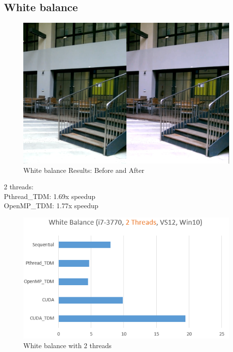 \documentclass{acm_proc_article-sp}
\begin{document}
\subsection{White balance}
\begin{figure}[H]
  \includegraphics[width=\linewidth,natwidth=1230,natheight=844]{whitebalance_comparison.png}
  \caption{White balance Results: Before and After}
  \label{fig:whitebalance_comparison}
\end{figure}
2 threads: \\
Pthread\_TDM: 1.69x speedup \\
OpenMP\_TDM: 1.77x speedup
\begin{figure}[H]
  \includegraphics[width=\linewidth,natwidth=569,natheight=336]{white2.png}
  \caption{White balance with 2 threads}
  \label{fig:white2}
\end{figure}
\end{document}
